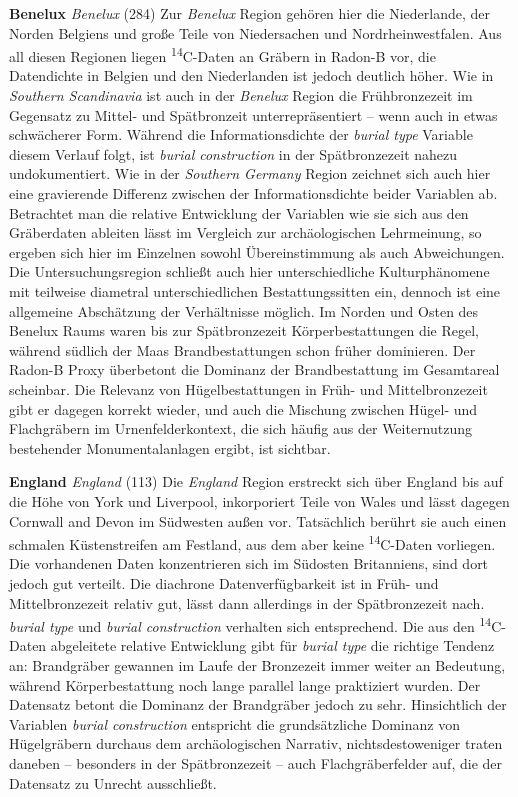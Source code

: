 \documentclass[openany,twoside,twocolumn]{book}
\begin{document}
\textbf{Benelux} \emph{Benelux} (284) \newline  Zur \emph{Benelux}
Region gehören hier die Niederlande, der Norden Belgiens und große Teile
von Niedersachen und Nordrheinwestfalen. Aus all diesen Regionen liegen
\textsuperscript{14}C-Daten an Gräbern in Radon-B vor, die Datendichte
in Belgien und den Niederlanden ist jedoch deutlich höher. Wie in
\emph{Southern Scandinavia} ist auch in der \emph{Benelux} Region die
Frühbronzezeit im Gegensatz zu Mittel- und Spätbronzeit
unterrepräsentiert -- wenn auch in etwas schwächerer Form. Während die
Informationsdichte der \emph{burial type} Variable diesem Verlauf folgt,
ist \emph{burial construction} in der Spätbronzezeit nahezu
undokumentiert. Wie in der \emph{Southern Germany} Region zeichnet sich
auch hier eine gravierende Differenz zwischen der Informationsdichte
beider Variablen ab. Betrachtet man die relative Entwicklung der
Variablen wie sie sich aus den Gräberdaten ableiten lässt im Vergleich
zur archäologischen Lehrmeinung, so ergeben sich hier im Einzelnen
sowohl Übereinstimmung als auch Abweichungen. Die Untersuchungsregion
schließt auch hier unterschiedliche Kulturphänomene mit teilweise
diametral unterschiedlichen Bestattungssitten ein, dennoch ist eine
allgemeine Abschätzung der Verhältnisse möglich. Im Norden und Osten des
Benelux Raums waren bis zur Spätbronzezeit Körperbestattungen die Regel,
während südlich der Maas Brandbestattungen schon früher dominieren. Der
Radon-B Proxy überbetont die Dominanz der Brandbestattung im Gesamtareal
scheinbar. Die Relevanz von Hügelbestattungen in Früh- und
Mittelbronzezeit gibt er dagegen korrekt wieder, und auch die Mischung
zwischen Hügel- und Flachgräbern im Urnenfelderkontext, die sich häufig
aus der Weiternutzung bestehender Monumentalanlagen ergibt, ist
sichtbar.

\textbf{England} \emph{England} (113) \newline  Die \emph{England}
Region erstreckt sich über England bis auf die Höhe von York und
Liverpool, inkorporiert Teile von Wales und lässt dagegen Cornwall and
Devon im Südwesten außen vor. Tatsächlich berührt sie auch einen
schmalen Küstenstreifen am Festland, aus dem aber keine
\textsuperscript{14}C-Daten vorliegen. Die vorhandenen Daten
konzentrieren sich im Südosten Britanniens, sind dort jedoch gut
verteilt. Die diachrone Datenverfügbarkeit ist in Früh- und
Mittelbronzezeit relativ gut, lässt dann allerdings in der
Spätbronzezeit nach. \emph{burial type} und \emph{burial construction}
verhalten sich entsprechend. Die aus den \textsuperscript{14}C-Daten
abgeleitete relative Entwicklung gibt für \emph{burial type} die
richtige Tendenz an: Brandgräber gewannen im Laufe der Bronzezeit immer
weiter an Bedeutung, während Körperbestattung noch lange parallel lange
praktiziert wurden. Der Datensatz betont die Dominanz der Brandgräber
jedoch zu sehr. Hinsichtlich der Variablen \emph{burial construction}
entspricht die grundsätzliche Dominanz von Hügelgräbern durchaus dem
archäologischen Narrativ, nichtsdestoweniger traten daneben -- besonders
in der Spätbronzezeit -- auch Flachgräberfelder auf, die der Datensatz
zu Unrecht ausschließt.
\end{document}
